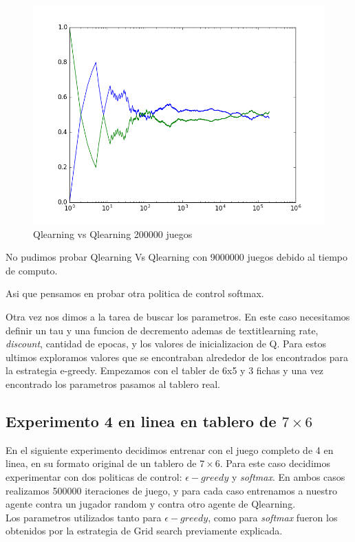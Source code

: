 \begin{figure}[h]
 \centering
 \begin{minipage}{.45\textwidth}
	\centering
	\includegraphics[scale=0.35]{img/QlearningQlearningEgreedy2000007x6(4).png}
       \caption{Qlearning vs Qlearning 200000 juegos}
  \end{minipage}
\end{figure}

No pudimos probar Qlearning Vs Qlearning con 9000000 juegos debido al tiempo de computo.


Asi que pensamos en probar otra politica de control softmax.

Otra vez nos dimos a la tarea de buscar los parametros. En este caso necesitamos definir un tau y una funcion de decremento
 ademas de textit{learning rate}, \textit{discount}, cantidad de epocas, y los valores de inicializacion de Q. Para estos ultimos exploramos valores que se encontraban alrededor de los encontrados para la estrategia e-greedy.
Empezamos con el tabler de 6x5 y 3 fichas y una vez encontrado los parametros pasamos al tablero real.







\subsection{Experimento 4 en linea en tablero de $7\times6$}
En el siguiente experimento decidimos entrenar con el juego completo de 4 en linea, en su formato original de un tablero
de $7\times6$. Para este caso decidimos experimentar con dos politicas de control: \textit{$\epsilon-greedy$} y
\textit{softmax}. En ambos casos realizamos 500000 iteraciones de juego, y para cada caso entrenamos a nuestro agente
contra un jugador random y contra otro agente de Qlearning. \\
Los parametros utilizados tanto para \textit{$\epsilon-greedy$}, como para \textit{softmax} fueron los obtenidos por la
estrategia de Grid search previamente explicada.

